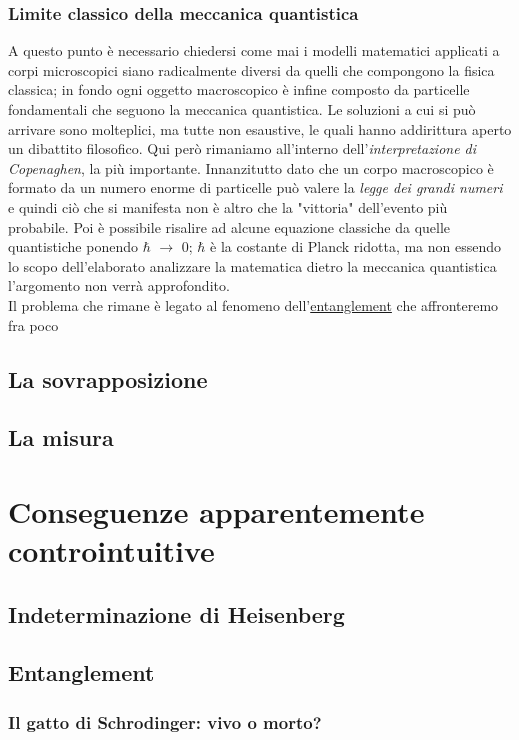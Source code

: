 \subsubsection{Limite classico della meccanica quantistica}
A questo punto è necessario chiedersi come mai i modelli matematici applicati a corpi microscopici siano radicalmente diversi da quelli che compongono la fisica classica; in fondo ogni oggetto macroscopico è infine composto da particelle fondamentali che seguono la meccanica quantistica.
Le soluzioni a cui si può arrivare sono molteplici, ma tutte non esaustive, le quali hanno addirittura aperto un dibattito filosofico. Qui però rimaniamo all'interno dell'\textit{interpretazione di Copenaghen}, la più importante. Innanzitutto dato che un corpo macroscopico è formato da un numero enorme di particelle può valere la \textit{legge dei grandi numeri} e quindi ciò che si manifesta non è altro che la "vittoria" dell'evento più probabile. Poi è possibile risalire ad alcune equazione classiche da quelle quantistiche ponendo $\hbar$ $\to$ 0; $\hbar$ è la costante di Planck ridotta, ma non essendo lo scopo dell'elaborato analizzare la matematica dietro la meccanica quantistica l'argomento non verrà approfondito.\\
Il problema che rimane è legato al fenomeno dell'\hyperref[sec:entanglement]{entanglement} che affronteremo fra poco

\subsection{La sovrapposizione}
\subsection{La misura}
\section{Conseguenze apparentemente controintuitive}
\subsection{Indeterminazione di Heisenberg}
\subsection{Entanglement}
\label{sec:entanglement}
\subsubsection{Il gatto di Schrodinger: vivo o morto?}
